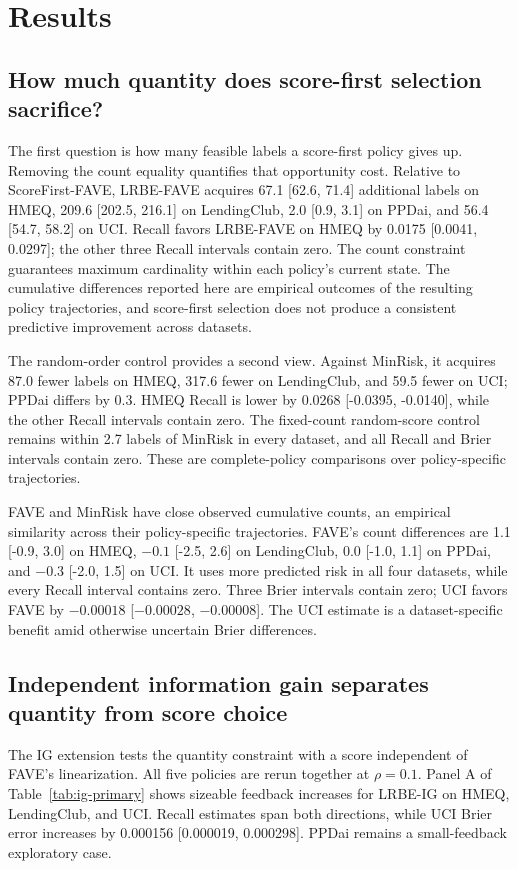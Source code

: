 \section{Results}
\label{sec:results}

\subsection{How much quantity does score-first selection sacrifice?}
The first question is how many feasible labels a score-first policy gives up. Removing the count equality quantifies that opportunity cost. Relative to ScoreFirst-FAVE, LRBE-FAVE acquires 67.1 [62.6, 71.4] additional labels on HMEQ, 209.6 [202.5, 216.1] on LendingClub, 2.0 [0.9, 3.1] on PPDai, and 56.4 [54.7, 58.2] on UCI. Recall favors LRBE-FAVE on HMEQ by 0.0175 [0.0041, 0.0297]; the other three Recall intervals contain zero. The count constraint guarantees maximum cardinality within each policy's current state. The cumulative differences reported here are empirical outcomes of the resulting policy trajectories, and score-first selection does not produce a consistent predictive improvement across datasets.

The random-order control provides a second view. Against MinRisk, it acquires 87.0 fewer labels on HMEQ, 317.6 fewer on LendingClub, and 59.5 fewer on UCI; PPDai differs by 0.3. HMEQ Recall is lower by 0.0268 [-0.0395, -0.0140], while the other Recall intervals contain zero. The fixed-count random-score control remains within 2.7 labels of MinRisk in every dataset, and all Recall and Brier intervals contain zero. These are complete-policy comparisons over policy-specific trajectories.

FAVE and MinRisk have close observed cumulative counts, an empirical similarity across their policy-specific trajectories. FAVE's count differences are 1.1 [-0.9, 3.0] on HMEQ, $-0.1$ [-2.5, 2.6] on LendingClub, 0.0 [-1.0, 1.1] on PPDai, and $-0.3$ [-2.0, 1.5] on UCI. It uses more predicted risk in all four datasets, while every Recall interval contains zero. Three Brier intervals contain zero; UCI favors FAVE by $-0.00018$ [$-0.00028$, $-0.00008$]. The UCI estimate is a dataset-specific benefit amid otherwise uncertain Brier differences.

\subsection{Independent information gain separates quantity from score choice}
The IG extension tests the quantity constraint with a score independent of FAVE's linearization. All five policies are rerun together at $\rho=0.1$. Panel A of Table~\ref{tab:ig-primary} shows sizeable feedback increases for LRBE-IG on HMEQ, LendingClub, and UCI. Recall estimates span both directions, while UCI Brier error increases by 0.000156 [0.000019, 0.000298]. PPDai remains a small-feedback exploratory case.

